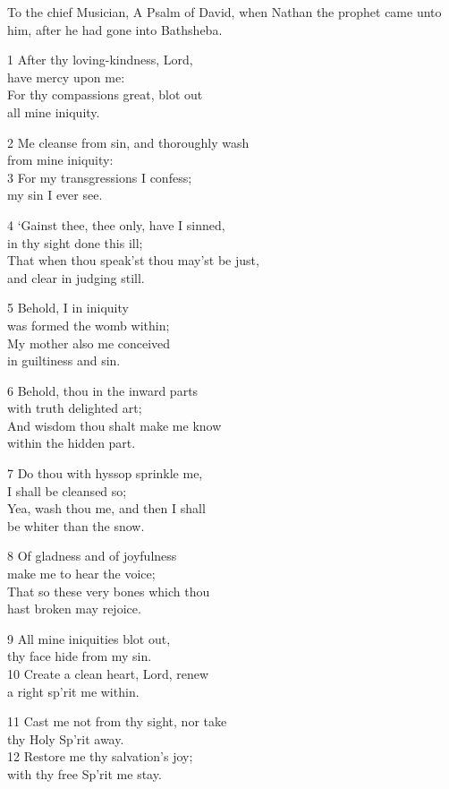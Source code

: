 To the chief Musician, A Psalm of David,
when Nathan the prophet came unto him, after he had gone into Bathsheba.

1 After thy loving-kindness, Lord,\\
have mercy upon me:\\
For thy compassions great, blot out\\
all mine iniquity.

2 Me cleanse from sin, and thoroughly wash\\
from mine iniquity:\\
3 For my transgressions I confess;\\
my sin I ever see.

4 ‘Gainst thee, thee only, have I sinned,\\
in thy sight done this ill;\\
That when thou speak’st thou may’st be just,\\
and clear in judging still.

5 Behold, I in iniquity\\
was formed the womb within;\\
My mother also me conceived\\
in guiltiness and sin.

6 Behold, thou in the inward parts\\
with truth delighted art;\\
And wisdom thou shalt make me know\\
within the hidden part.

7 Do thou with hyssop sprinkle me,\\
I shall be cleansed so;\\
Yea, wash thou me, and then I shall\\
be whiter than the snow.

8 Of gladness and of joyfulness\\
make me to hear the voice;\\
That so these very bones which thou\\
hast broken may rejoice.

9 All mine iniquities blot out,\\
thy face hide from my sin.\\
10 Create a clean heart, Lord, renew\\
a right sp’rit me within.

11 Cast me not from thy sight, nor take\\
thy Holy Sp’rit away.\\
12 Restore me thy salvation’s joy;\\
with thy free Sp’rit me stay.


